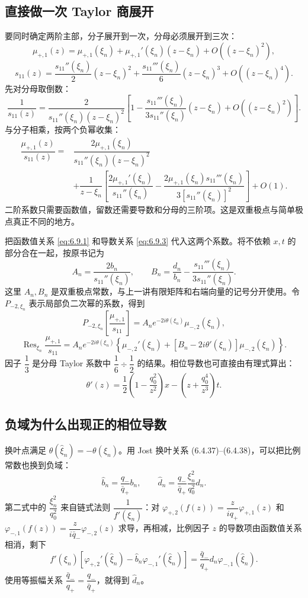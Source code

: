 \documentclass[lang=cn,scheme=chinese,mode=simple,device=normal,color=blue,math=cm,thmcnt=section,12pt]{elegantbook}
\DeclareMathOperator*{\Res}{Res}
\newcommand{\eqq}[2]{\tag{#1}\label{eq:#1}#2}
\begin{document}
\subsection*{直接做一次 Taylor 商展开}
要同时确定两阶主部，分子展开到一次，分母必须展开到三次：
\[
\mu_{+,1}(z)=\mu_{+,1}(\xi_n)+\mu_{+,1}'(\xi_n)(z-\xi_n)
+O((z-\xi_n)^2),
\]
\[
s_{11}(z)=\dfrac{s_{11}''(\xi_n)}{2}(z-\xi_n)^2
+\dfrac{s_{11}'''(\xi_n)}{6}(z-\xi_n)^3+O((z-\xi_n)^4).
\]
先对分母取倒数：
\[
\dfrac{1}{s_{11}(z)}
=\dfrac{2}{s_{11}''(\xi_n)(z-\xi_n)^2}
\left[1-\dfrac{s_{11}'''(\xi_n)}{3s_{11}''(\xi_n)}(z-\xi_n)
+O((z-\xi_n)^2)\right].
\]
与分子相乘，按两个负幂收集：
\[
\begin{aligned}
\dfrac{\mu_{+,1}(z)}{s_{11}(z)}
={}&\dfrac{2\mu_{+,1}(\xi_n)}
{s_{11}''(\xi_n)(z-\xi_n)^2}\\
&+\dfrac{1}{z-\xi_n}
\left[\dfrac{2\mu_{+,1}'(\xi_n)}{s_{11}''(\xi_n)}
-\dfrac{2\mu_{+,1}(\xi_n)s_{11}'''(\xi_n)}
{3[s_{11}''(\xi_n)]^2}\right]+O(1).
\end{aligned}
\]
二阶系数只需要函数值，留数还需要导数和分母的三阶项。这是双重极点与简单极点真正不同的地方。

把函数值关系 \eqref{eq:6.9.1} 和导数关系 \eqref{eq:6.9.3} 代入这两个系数。将不依赖 $x,t$ 的部分合在一起，按原书记为
\[
A_n=\dfrac{2b_n}{s_{11}''(\xi_n)},\qquad
B_n=\dfrac{d_n}{b_n}-\dfrac{s_{11}'''(\xi_n)}{3s_{11}''(\xi_n)}.
\]
这里 $A_n,B_n$ 是双重极点常数，与上一讲有限矩阵和右端向量的记号分开使用。令 $P_{-2,\xi_n}$ 表示局部负二次幂的系数，得到
\begin{equation}\eqq{6.9.6}{P_{-2,\xi_n}
\left[\dfrac{\mu_{+,1}}{s_{11}}\right]
=A_ne^{-2i\theta(\xi_n)}\mu_{-,2}(\xi_n),}\end{equation}
\begin{equation}\eqq{6.9.7}{\Res_{\xi_n}\dfrac{\mu_{+,1}}{s_{11}}
=A_ne^{-2i\theta(\xi_n)}
\left\{\mu_{-,2}'(\xi_n)+[B_n-2i\theta'(\xi_n)]\mu_{-,2}(\xi_n)\right\}.}\end{equation}
因子 $\dfrac{1}{3}$ 是分母 Taylor 系数中 $\dfrac{1}{6}\div\dfrac{1}{2}$ 的结果。相位导数也可直接由有理式算出：
\[
\theta'(z)=\dfrac{1}{2}\left(1-\dfrac{q_0^2}{z^2}\right)x
-\left(z+\dfrac{q_0^4}{z^3}\right)t.
\]

\subsection*{负域为什么出现正的相位导数}
换叶点满足 $\theta(\widehat\xi_n)=-\theta(\xi_n)$。用 Jost 换叶关系 (6.4.37)--(6.4.38)，可以把比例常数也换到负域：
\[
\widehat b_n=\dfrac{q_-}{\bar q_+}b_n,\qquad
\widehat d_n=\dfrac{q_-}{\bar q_+}\dfrac{\xi_n^2}{q_0^2}d_n.
\]
第二式中的 $\dfrac{\xi_n^2}{q_0^2}$ 来自链式法则 $\dfrac{1}{f'(\xi_n)}$：对
$\varphi_{+,2}(f(z))=\dfrac{z}{iq_+}\varphi_{+,1}(z)$
和
$\varphi_{-,1}(f(z))=\dfrac{z}{i\bar q_-}\varphi_{-,2}(z)$
求导，再相减，比例因子 $z$ 的导数项由函数值关系相消，剩下
\[
f'(\xi_n)
\left[\varphi_{+,2}'(\widehat\xi_n)
-\widehat b_n\varphi_{-,1}'(\widehat\xi_n)\right]
=\dfrac{\bar q_-}{q_+}d_n\varphi_{-,1}(\widehat\xi_n).
\]
使用等振幅关系 $\dfrac{\bar q_-}{q_+}=\dfrac{q_-}{\bar q_+}$，就得到 $\widehat d_n$。
\end{document}
